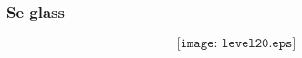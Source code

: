\documentclass[aspectratio=169,xcolor=dvipsnames]{beamer}
\begin{document}
%
%
%
%
%
%
%
%
%
%
\begin{frame}
	\frametitle{Se glass}

$$\texttt{[image: level20.eps]}$$
\end{frame}
%
%
%
%
%
\end{document}

